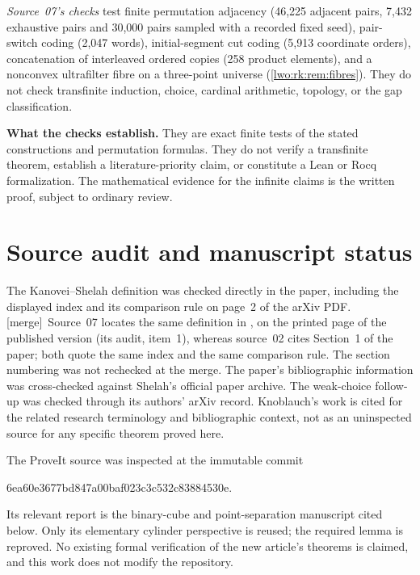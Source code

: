 \documentclass[11pt,a4paper]{article}
\theoremstyle{definition}
\theoremstyle{remark}
\newcommand{\merge}{\textsf{[merge]}}
\begin{document}
\emph{Source~07's checks} test finite permutation adjacency (46,225 adjacent
pairs, 7,432 exhaustive pairs and 30,000 pairs sampled with a recorded fixed
seed), pair-switch coding (2,047 words), initial-segment cut coding (5,913
coordinate orders), concatenation of interleaved ordered copies (258 product
elements), and a nonconvex ultrafilter fibre on a three-point universe
(\cref{lwo:rk:rem:fibres}). They do not check transfinite induction, choice,
cardinal arithmetic, topology, or the gap classification.

\begin{resultbox}
\textbf{What the checks establish.} They are exact finite tests of the
stated constructions and permutation formulas. They do not verify a
transfinite theorem, establish a literature-priority claim, or constitute
a Lean or Rocq formalization. The mathematical evidence for the infinite
claims is the written proof, subject to ordinary review.
\end{resultbox}

\section{Source audit and manuscript status}\label{lwo:app:sources}

The Kanovei--Shelah definition was checked directly in the paper, including
the displayed index and its comparison rule on page~2 of the arXiv PDF.
\merge\ Source~07 locates the same definition in \cite[\S2, p.~160]{KS},
on the printed page of the published version (its audit, item~1), whereas
source~02 cites Section~1 of the paper; both quote the same index and the
same comparison rule. The section numbering was not rechecked at the merge.
The paper's bibliographic information was cross-checked against Shelah's
official paper archive. The weak-choice follow-up was checked through its
authors' arXiv record. Knoblauch's work is cited for the related research
terminology and bibliographic context, not as an uninspected source for any
specific theorem proved here.

The ProveIt source was inspected at the immutable commit
\begin{center}\small\ttfamily
6ea60e3677bd847a00baf023c3c532c83884530e.
\end{center}
Its relevant report is the binary-cube and point-separation manuscript
cited below. Only its elementary cylinder perspective is reused; the
required lemma is reproved. No existing formal verification of the new
article's theorems is claimed, and this work does not modify the repository.
\end{document}
